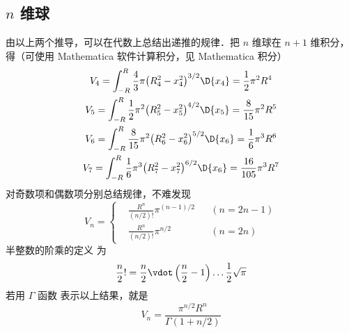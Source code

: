 \subsection{ $n$ 维球}
由以上两个推导，可以在代数上总结出递推的规律．把 $n$ 维球在 $n+1$ 维积分，得（可使用  Mathematica 软件计算积分，见 Mathematica 积分）%
\begin{gather}
{V_4} = \int_{ - R}^R {\frac{4}{3}\pi {{\left( {R_4^2 - x_4^2} \right)}^{3/2}}\D {x_4}}  = \frac{1}{2}{\pi ^2}{R^4}\\
%
{V_5} = \int_{ - R}^R {\frac{1}{2}{\pi ^2}{{\left( {R_5^2 - x_5^2} \right)}^{4/2}}\D {x_5}}  = \frac{8}{{15}}{\pi ^2}{R^5}\\
%
{V_6} = \int_{ - R}^R {\frac{8}{{15}}{\pi ^2}{{\left( {R_6^2 - x_6^2} \right)}^{5/2}}\D {x_6}}  = \frac{1}{6}{\pi ^3}{R^6}\\
%
{V_7} = \int_{ - R}^R {\frac{1}{6}{\pi ^3}{{\left( {R_7^2 - x_7^2} \right)}^{6/2}}\D {x_6}}  = \frac{{16}}{{105}}{\pi ^3}{R^7}
\end{gather}
对奇数项和偶数项分别总结规律，不难发现
\begin{equation}
{V_n} = \left\{ \begin{aligned}
&\frac{R^n}{(n/2)!} \pi ^{(n - 1)/2} &&(n= 2n - 1)\\
&\frac{R^n}{(n/2)!} \pi ^{n/2} &&(n=2n)
\end{aligned} \right.
\end{equation}
半整数的阶乘的定义 为
\begin{equation}
\frac{n}{2}! = \frac{n}{2} \vdot \left(\frac{{n}}{2}-1\right)\dots\frac{1}{2}\sqrt{\pi}
\end{equation}
若用 $\Gamma $ 函数 表示以上结果，就是
\begin{equation}
{V_n} = \frac{\pi ^{n/2}{R^n}}{\Gamma (1 + n/2)}
\end{equation}








